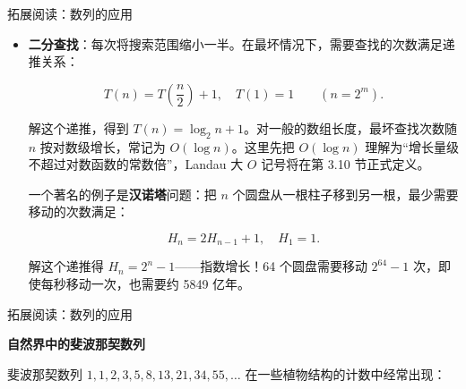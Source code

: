 \documentclass[aspectratio=169,10pt,fontset=fandol]{ctexbeamer}
\begin{document}
\begin{frame}[t,fragile]{拓展阅读：数列的应用}
\normalsize
{\normalsize
\begin{itemize}

\item \textbf{二分查找}：每次将搜索范围缩小一半。在最坏情况下，需要查找的次数满足递推关系：

\[

T(n) = T\left(\dfrac{n}{2}\right) + 1,\quad T(1) = 1\qquad(n=2^m).

\]

解这个递推，得到 \(T(n)=\log_2 n+1\)。对一般的数组长度，最坏查找次数随 $n$ 按对数级增长，常记为 \(O(\log n)\)。这里先把 \(O(\log n)\) 理解为“增长量级不超过对数函数的常数倍”，Landau 大 \(O\) 记号将在第 3.10 节正式定义。





一个著名的例子是\textbf{汉诺塔}问题：把 \(n\) 个圆盘从一根柱子移到另一根，最少需要移动的次数满足：

\[

H_n = 2H_{n-1} + 1,\quad H_1 = 1.

\]

解这个递推得 \(H_n = 2^n - 1\)——指数增长！64 个圆盘需要移动 \(2^{64}-1\) 次，即使每秒移动一次，也需要约 5849 亿年。

\end{itemize}
}
\end{frame}
\begin{frame}[t,fragile]{拓展阅读：数列的应用}
\normalsize
{\normalsize




\textbf{自然界中的斐波那契数列}



斐波那契数列 \(1, 1, 2, 3, 5, 8, 13, 21, 34, 55, \ldots\) 在一些植物结构的计数中经常出现：




}
\end{frame}
\end{document}
